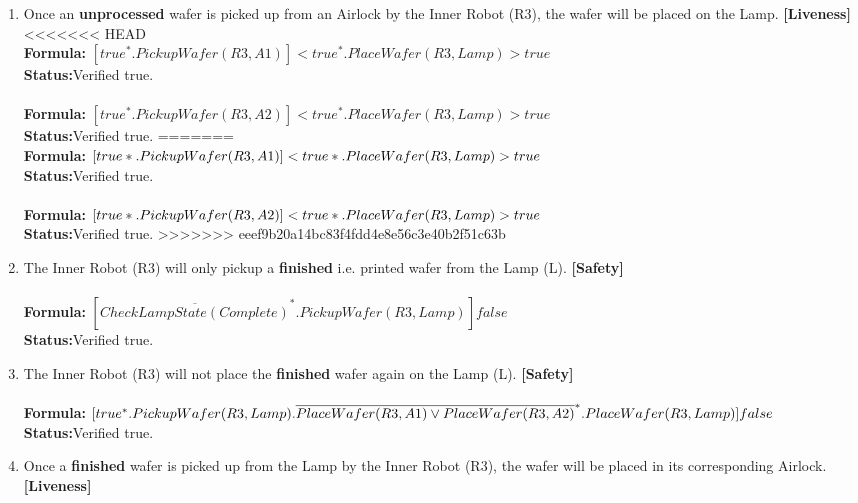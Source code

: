 \documentclass[a4paper,12pt]{article}
\begin{document}
\begin{enumerate}
		
		\item Once an \textbf{unprocessed} wafer is picked up from an Airlock by the Inner Robot (R3), the wafer will be placed on the Lamp. \textbf{[Liveness]}
		\\
<<<<<<< HEAD
		\\\textbf{Formula:} $[true^*.PickupWafer(R3,A1)]<true^*.PlaceWafer(R3,Lamp)>true$ \\\textbf{Status:}Verified true.
		\\
		\\\textbf{Formula:} $[true^*.PickupWafer(R3,A2)] <true^*.PlaceWafer(R3,Lamp)>true$ \\\textbf{Status:}Verified true.
=======
		\\\textbf{Formula:} $[true*.PickupWafer(R3,A1)] <true*.\\PlaceWafer(R3,Lamp)>true$ \\\textbf{Status:}Verified true.
		\\
		\\\textbf{Formula:} $[true*.PickupWafer(R3,A2)] <true*.\\PlaceWafer(R3,Lamp)>true$ \\\textbf{Status:}Verified true.
>>>>>>> eeef9b20a14bc83f4fdd4e8e56c3e40b2f51c63b
		\item The Inner Robot (R3) will only pickup a \textbf{finished} i.e. printed wafer from the Lamp (L). \textbf{[Safety]}
		\\
		\\\textbf{Formula:} $[ \overline{CheckLampState(Complete)}^*.PickupWafer(R3,Lamp)]  false$ 
		\\\textbf{Status:}Verified true.
		\item The Inner Robot (R3) will not place the \textbf{finished} wafer again on the Lamp (L). \textbf{[Safety]}
		\\
		\\\textbf{Formula:} $[true^*.PickupWafer(R3,Lamp).
		\\ \overline{PlaceWafer(R3,A1) \vee PlaceWafer(R3,A2)}^*.PlaceWafer(R3,Lamp)] false$ \\\textbf{Status:}Verified true.
		\item Once a \textbf{finished} wafer is picked up from the Lamp by the Inner Robot (R3), the wafer will be placed in its corresponding Airlock. \textbf{[Liveness]}
		\\

\end{enumerate}
\end{document}
